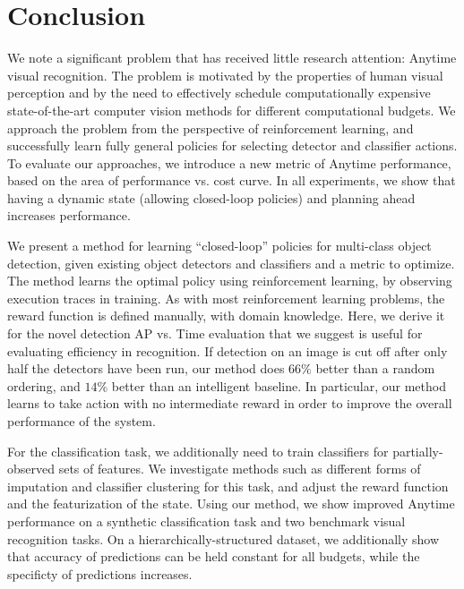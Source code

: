 \chapter{Conclusion}\label{sec:conclusion}

We note a significant problem that has received little research attention: Anytime visual recognition.
The problem is motivated by the properties of human visual perception and by the need to effectively schedule computationally expensive state-of-the-art computer vision methods for different computational budgets.
We approach the problem from the perspective of reinforcement learning, and successfully learn fully general policies for selecting detector and classifier actions.
To evaluate our approaches, we introduce a new metric of Anytime performance, based on the area of performance vs. cost curve.
In all experiments, we show that having a dynamic state (allowing closed-loop policies) and planning ahead increases performance.

We present a method for learning ``closed-loop'' policies for multi-class object detection, given existing object detectors and classifiers and a metric to optimize.
The method learns the optimal policy using reinforcement learning, by observing execution traces in training.
As with most reinforcement learning problems, the reward function is defined manually, with domain knowledge.
Here, we derive it for the novel detection AP vs. Time evaluation that we suggest is useful for evaluating efficiency in recognition.
If detection on an image is cut off after only half the detectors have been run, our method does $66\%$ better than a random ordering, and $14\%$ better than an intelligent baseline.
In particular, our method learns to take action with no intermediate reward in order to improve the overall performance of the system.

For the classification task, we additionally need to train classifiers for partially-observed sets of features.
We investigate methods such as different forms of imputation and classifier clustering for this task, and adjust the reward function and the featurization of the state.
Using our method, we show improved Anytime performance on a synthetic classification task and two benchmark visual recognition tasks.
On a hierarchically-structured dataset, we additionally show that accuracy of predictions can be held constant for all budgets, while the specificty of predictions increases.


